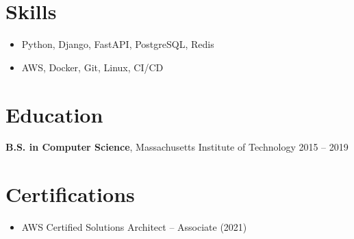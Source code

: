 \documentclass[11pt,a4paper]{article}
\begin{document}
\section*{Skills}
\begin{itemize}
  \item Python, Django, FastAPI, PostgreSQL, Redis
  \item AWS, Docker, Git, Linux, CI/CD
\end{itemize}

\section*{Education}
\textbf{B.S. in Computer Science}, Massachusetts Institute of Technology \hfill 2015 -- 2019

\section*{Certifications}
\begin{itemize}
  \item AWS Certified Solutions Architect -- Associate (2021)
\end{itemize}
\end{document}
